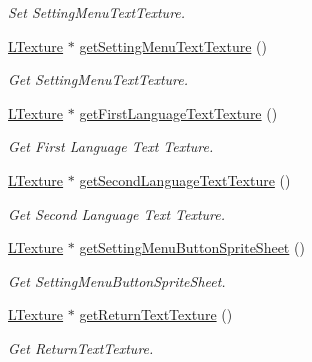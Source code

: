 \begin{DoxyCompactItemize}
\begin{DoxyCompactList}\small\item\em Set Setting\+Menu\+Text\+Texture. \end{DoxyCompactList}\item 
\mbox{\label{class_setting_menu_a78a8fddfbcbf4c56e83babba6da8089a}} 
\mbox{\hyperlink{class_l_texture}{L\+Texture}} $\ast$ \mbox{\hyperlink{class_setting_menu_a78a8fddfbcbf4c56e83babba6da8089a}{get\+Setting\+Menu\+Text\+Texture}} ()
\begin{DoxyCompactList}\small\item\em Get Setting\+Menu\+Text\+Texture. \end{DoxyCompactList}\item 
\mbox{\label{class_setting_menu_a0e4ab47949ecbef4a703e32dac67b7d8}} 
\mbox{\hyperlink{class_l_texture}{L\+Texture}} $\ast$ \mbox{\hyperlink{class_setting_menu_a0e4ab47949ecbef4a703e32dac67b7d8}{get\+First\+Language\+Text\+Texture}} ()
\begin{DoxyCompactList}\small\item\em Get First Language Text Texture. \end{DoxyCompactList}\item 
\mbox{\label{class_setting_menu_a63264e62205fdd5a8ba3827a1b482144}} 
\mbox{\hyperlink{class_l_texture}{L\+Texture}} $\ast$ \mbox{\hyperlink{class_setting_menu_a63264e62205fdd5a8ba3827a1b482144}{get\+Second\+Language\+Text\+Texture}} ()
\begin{DoxyCompactList}\small\item\em Get Second Language Text Texture. \end{DoxyCompactList}\item 
\mbox{\label{class_setting_menu_a0319830a231afba4565b62a292d40048}} 
\mbox{\hyperlink{class_l_texture}{L\+Texture}} $\ast$ \mbox{\hyperlink{class_setting_menu_a0319830a231afba4565b62a292d40048}{get\+Setting\+Menu\+Button\+Sprite\+Sheet}} ()
\begin{DoxyCompactList}\small\item\em Get Setting\+Menu\+Button\+Sprite\+Sheet. \end{DoxyCompactList}\item 
\mbox{\label{class_setting_menu_a1895a2689e2981738654b1534457c40e}} 
\mbox{\hyperlink{class_l_texture}{L\+Texture}} $\ast$ \mbox{\hyperlink{class_setting_menu_a1895a2689e2981738654b1534457c40e}{get\+Return\+Text\+Texture}} ()
\begin{DoxyCompactList}\small\item\em Get Return\+Text\+Texture. \end{DoxyCompactList}\end{DoxyCompactItemize}
